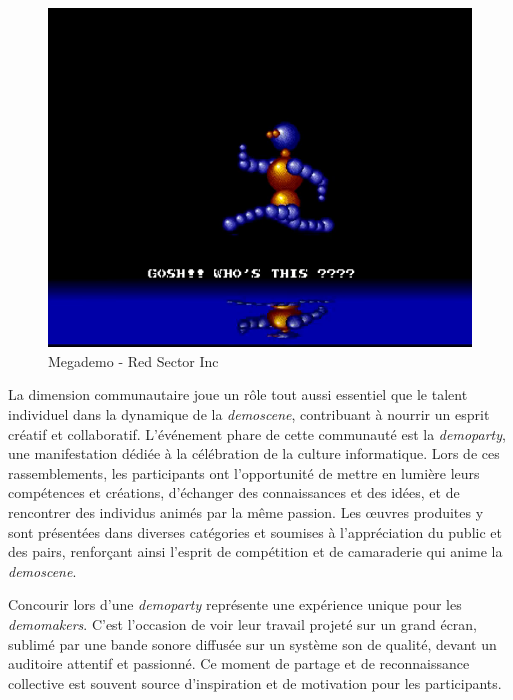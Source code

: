 \begin{figure}[h]
\begin{minipage}[b]{0.30\linewidth}
  \end{minipage}
  \hfill
  \begin{minipage}[b]{0.30\linewidth}
    \centering
    \includegraphics[width=\linewidth]{images/demoscene/demos/mega3.png}
  \end{minipage}
  \caption{Megademo - Red Sector Inc}
  \label{mega}
\end{figure}


La dimension communautaire joue un rôle tout aussi essentiel que le talent individuel dans la dynamique de la \textit{demoscene}, contribuant à nourrir un esprit créatif et collaboratif. L'événement phare de cette communauté est la \textit{demoparty}, une manifestation dédiée à la célébration de la culture informatique. Lors de ces rassemblements, les participants ont l'opportunité de mettre en lumière leurs compétences et créations, d'échanger des connaissances et des idées, et de rencontrer des individus animés par la même passion. Les œuvres produites y sont présentées dans diverses catégories et soumises à l'appréciation du public et des pairs, renforçant ainsi l'esprit de compétition et de camaraderie qui anime la \textit{demoscene}.

Concourir lors d'une \textit{demoparty} représente une expérience unique pour les \textit{demomakers}. C'est l'occasion de voir leur travail projeté sur un grand écran, sublimé par une bande sonore diffusée sur un système son de qualité, devant un auditoire attentif et passionné. Ce moment de partage et de reconnaissance collective est souvent source d'inspiration et de motivation pour les participants.




